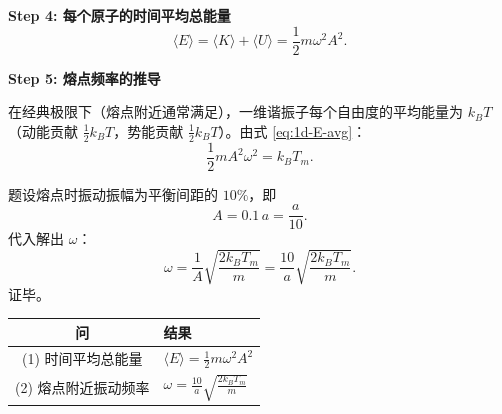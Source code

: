 \begin{derivationbox}[标准解题过程]
\textbf{Step 4: 每个原子的时间平均总能量}
\begin{equation}
\boxed{\langle E\rangle = \langle K\rangle + \langle U\rangle = \frac12 m\omega^2 A^2.}
\label{eq:1d-E-avg}
\end{equation}

\textbf{Step 5: 熔点频率的推导}

在经典极限下（熔点附近通常满足），一维谐振子每个自由度的平均能量为 $k_BT$（动能贡献 $\frac12k_BT$，势能贡献 $\frac12k_BT$）。由式 \eqref{eq:1d-E-avg}：
\begin{equation}
\frac12 mA^2\omega^2 = k_BT_m.
\end{equation}

题设熔点时振动振幅为平衡间距的 $10\%$，即
\begin{equation}
A = 0.1\,a = \frac{a}{10}.
\end{equation}
代入解出 $\omega$：
\begin{equation}
\omega = \frac{1}{A}\sqrt{\frac{2k_BT_m}{m}} = \frac{10}{a}\sqrt{\frac{2k_BT_m}{m}}.
\end{equation}
证毕。
\end{derivationbox}

\begin{formulabox}[答案汇总]
\begin{center}
\begin{tabular}{cl}
\toprule
问 & 结果 \\
\midrule
(1) 时间平均总能量 & $\displaystyle \langle E\rangle = \frac12 m\omega^2 A^2$ \\[8pt]
(2) 熔点附近振动频率 & $\displaystyle \omega = \frac{10}{a}\sqrt{\frac{2k_BT_m}{m}}$ \\
\bottomrule
\end{tabular}
\end{center}
\end{formulabox}

